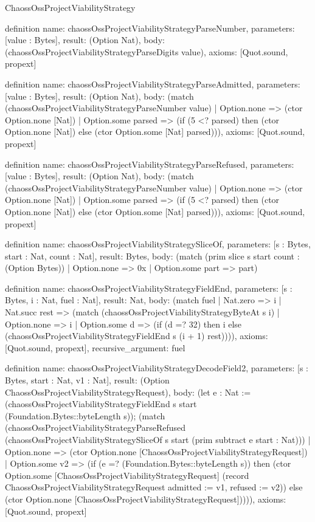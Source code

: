 \begin{lexlean}{ChaossOssProjectViabilityStrategy}
\begin{semanticmodule}
definition{
  name: chaossOssProjectViabilityStrategyParseNumber,
  parameters: [value : Bytes],
  result: (Option Nat),
  body: (chaossOssProjectViabilityStrategyParseDigits value),
  axioms: [Quot.sound, propext]
}

definition{
  name: chaossOssProjectViabilityStrategyParseAdmitted,
  parameters: [value : Bytes],
  result: (Option Nat),
  body: (match (chaossOssProjectViabilityStrategyParseNumber value)
    | Option.none => (ctor Option.none [Nat])
    | Option.some parsed => (if (5 <? parsed) then (ctor Option.none [Nat]) else (ctor Option.some [Nat] parsed))),
  axioms: [Quot.sound, propext]
}

definition{
  name: chaossOssProjectViabilityStrategyParseRefused,
  parameters: [value : Bytes],
  result: (Option Nat),
  body: (match (chaossOssProjectViabilityStrategyParseNumber value)
    | Option.none => (ctor Option.none [Nat])
    | Option.some parsed => (if (5 <? parsed) then (ctor Option.none [Nat]) else (ctor Option.some [Nat] parsed))),
  axioms: [Quot.sound, propext]
}

definition{
  name: chaossOssProjectViabilityStrategySliceOf,
  parameters: [s : Bytes, start : Nat, count : Nat],
  result: Bytes,
  body: (match (prim slice s start count : (Option Bytes))
    | Option.none => 0x
    | Option.some part => part)
}

definition{
  name: chaossOssProjectViabilityStrategyFieldEnd,
  parameters: [s : Bytes, i : Nat, fuel : Nat],
  result: Nat,
  body: (match fuel
    | Nat.zero => i
    | Nat.succ rest => (match (chaossOssProjectViabilityStrategyByteAt s i)
      | Option.none => i
      | Option.some d => (if (d =? 32) then i else (chaossOssProjectViabilityStrategyFieldEnd s (i + 1) rest)))),
  axioms: [Quot.sound, propext],
  recursive_argument: fuel
}

definition{
  name: chaossOssProjectViabilityStrategyDecodeField2,
  parameters: [s : Bytes, start : Nat, v1 : Nat],
  result: (Option ChaossOssProjectViabilityStrategyRequest),
  body: (let e : Nat := (chaossOssProjectViabilityStrategyFieldEnd s start (Foundation.Bytes::byteLength s)); (match (chaossOssProjectViabilityStrategyParseRefused (chaossOssProjectViabilityStrategySliceOf s start (prim subtract e start : Nat)))
    | Option.none => (ctor Option.none [ChaossOssProjectViabilityStrategyRequest])
    | Option.some v2 => (if (e =? (Foundation.Bytes::byteLength s)) then (ctor Option.some [ChaossOssProjectViabilityStrategyRequest] (record ChaossOssProjectViabilityStrategyRequest {admitted := v1, refused := v2})) else (ctor Option.none [ChaossOssProjectViabilityStrategyRequest])))),
  axioms: [Quot.sound, propext]
}


\end{semanticmodule}
\end{lexlean}
